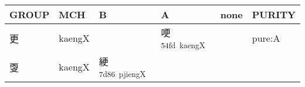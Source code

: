 \documentclass[14pt,a4paper]{scrartcl}
\begin{document}
\begin{longtable}[c]{@{}llllll@{}}
\toprule
\begin{minipage}[b]{0.14\columnwidth}\raggedright\strut
GROUP
\strut\end{minipage} &
\begin{minipage}[b]{0.14\columnwidth}\raggedright\strut
MCH
\strut\end{minipage} &
\begin{minipage}[b]{0.14\columnwidth}\raggedright\strut
B
\strut\end{minipage} &
\begin{minipage}[b]{0.14\columnwidth}\raggedright\strut
A
\strut\end{minipage} &
\begin{minipage}[b]{0.14\columnwidth}\raggedright\strut
none
\strut\end{minipage} &
\begin{minipage}[b]{0.14\columnwidth}\raggedright\strut
PURITY
\strut\end{minipage}\tabularnewline
\midrule
\endhead
\begin{minipage}[t]{0.14\columnwidth}\raggedright\strut
更
\strut\end{minipage} &
\begin{minipage}[t]{0.14\columnwidth}\raggedright\strut
kaengX
\strut\end{minipage} &
\begin{minipage}[t]{0.14\columnwidth}\raggedright\strut
\strut\end{minipage} &
\begin{minipage}[t]{0.14\columnwidth}\raggedright\strut
哽\textsuperscript{54fd~kaengX}
\strut\end{minipage} &
\begin{minipage}[t]{0.14\columnwidth}\raggedright\strut
\strut\end{minipage} &
\begin{minipage}[t]{0.14\columnwidth}\raggedright\strut
pure:A
\strut\end{minipage}\tabularnewline
\begin{minipage}[t]{0.14\columnwidth}\raggedright\strut
㪅
\strut\end{minipage} &
\begin{minipage}[t]{0.14\columnwidth}\raggedright\strut
kaengX
\strut\end{minipage} &
\begin{minipage}[t]{0.14\columnwidth}\raggedright\strut
綆\textsuperscript{7d86~pjiengX}
\strut\end{minipage} &

\end{longtable}
\end{document}
